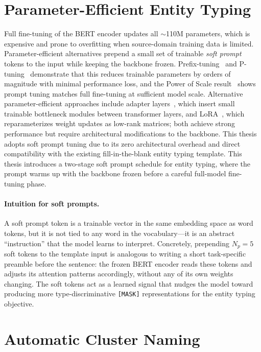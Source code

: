 \documentclass[14pt]{extreport}
\begin{document}
\section{Parameter-Efficient Entity Typing}

Full fine-tuning of the BERT encoder updates all $\sim$110M parameters, which is expensive and prone to overfitting when source-domain training data is limited. Parameter-efficient alternatives prepend a small set of trainable \emph{soft prompt} tokens to the input while keeping the backbone frozen. Prefix-tuning~\cite{li-liang-2021-prefix} and P-tuning~\cite{liu-etal-2022-ptuning} demonstrate that this reduces trainable parameters by orders of magnitude with minimal performance loss, and the Power of Scale result~\cite{lester-etal-2021-power} shows prompt tuning matches full fine-tuning at sufficient model scale. Alternative parameter-efficient approaches include adapter layers~\cite{houlsby-etal-2019-parameter}, which insert small trainable bottleneck modules between transformer layers, and LoRA~\cite{hu-etal-2022-lora}, which reparameterizes weight updates as low-rank matrices; both achieve strong performance but require architectural modifications to the backbone. This thesis adopts soft prompt tuning due to its zero architectural overhead and direct compatibility with the existing fill-in-the-blank entity typing template. This thesis introduces a two-stage soft prompt schedule for entity typing, where the prompt warms up with the backbone frozen before a careful full-model fine-tuning phase.

\paragraph{Intuition for soft prompts.}
A soft prompt token is a trainable vector in the same embedding space as word tokens, but it is not tied to any word in the vocabulary---it is an abstract ``instruction'' that the model learns to interpret. Concretely, prepending $N_p = 5$ soft tokens to the template input is analogous to writing a short task-specific preamble before the sentence: the frozen BERT encoder reads these tokens and adjusts its attention patterns accordingly, without any of its own weights changing. The soft tokens act as a learned signal that nudges the model toward producing more type-discriminative \texttt{[MASK]} representations for the entity typing objective.

\section{Automatic Cluster Naming}
\end{document}

